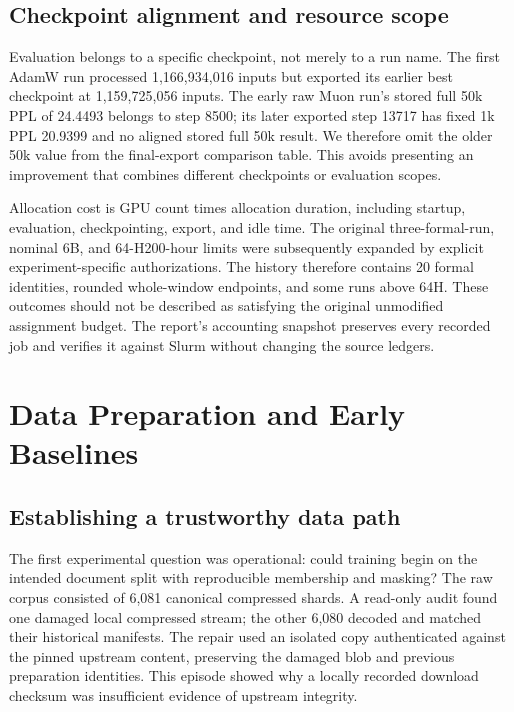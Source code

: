 \subsection{Checkpoint alignment and resource scope}

Evaluation belongs to a specific checkpoint, not merely to a run name. The first AdamW run processed 1,166,934,016 inputs but exported its earlier best checkpoint at 1,159,725,056 inputs. The early raw Muon run's stored full 50k PPL of 24.4493 belongs to step 8500; its later exported step 13717 has fixed 1k PPL 20.9399 and no aligned stored full 50k result. We therefore omit the older 50k value from the final-export comparison table. This avoids presenting an improvement that combines different checkpoints or evaluation scopes.

Allocation cost is GPU count times allocation duration, including startup, evaluation, checkpointing, export, and idle time. The original three-formal-run, nominal 6B, and 64-H200-hour limits were subsequently expanded by explicit experiment-specific authorizations. The history therefore contains 20 formal identities, rounded whole-window endpoints, and some runs above 64H. These outcomes should not be described as satisfying the original unmodified assignment budget. The report's accounting snapshot preserves every recorded job and verifies it against Slurm without changing the source ledgers.

\section{Data Preparation and Early Baselines}
\label{sec:baseline}

\subsection{Establishing a trustworthy data path}

The first experimental question was operational: could training begin on the intended document split with reproducible membership and masking? The raw corpus consisted of 6,081 canonical compressed shards. A read-only audit found one damaged local compressed stream; the other 6,080 decoded and matched their historical manifests. The repair used an isolated copy authenticated against the pinned upstream content, preserving the damaged blob and previous preparation identities. This episode showed why a locally recorded download checksum was insufficient evidence of upstream integrity.

